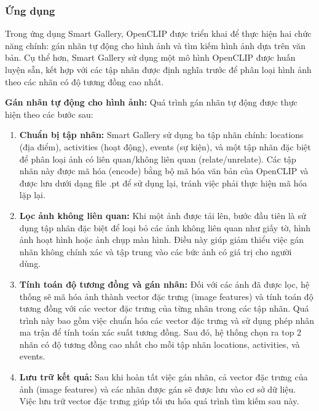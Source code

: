 \subsubsection{Ứng dụng}

Trong ứng dụng Smart Gallery, OpenCLIP được triển khai để thực hiện hai chức năng chính: gán nhãn tự động cho hình ảnh và tìm kiếm hình ảnh dựa trên văn bản. Cụ thể hơn, Smart Gallery sử dụng một mô hình OpenCLIP được huấn luyện sẵn, kết hợp với các tập nhãn được định nghĩa trước để phân loại hình ảnh theo các nhãn có độ tương đồng cao nhất.

\textbf{Gán nhãn tự động cho hình ảnh:} Quá trình gán nhãn tự động được thực hiện theo các bước sau:

\begin{enumerate}
    \item \textbf{Chuẩn bị tập nhãn:} Smart Gallery sử dụng ba tập nhãn chính: locations (địa điểm), activities (hoạt động), events (sự kiện), và một tập nhãn đặc biệt để phân loại ảnh có liên quan/không liên quan (relate/unrelate). Các tập nhãn này được mã hóa (encode) bằng bộ mã hóa văn bản của OpenCLIP và được lưu dưới dạng file .pt để sử dụng lại, tránh việc phải thực hiện mã hóa lặp lại.
    
    \item \textbf{Lọc ảnh không liên quan:} Khi một ảnh được tải lên, bước đầu tiên là sử dụng tập nhãn đặc biệt để loại bỏ các ảnh không liên quan như giấy tờ, hình ảnh hoạt hình hoặc ảnh chụp màn hình. Điều này giúp giảm thiểu việc gán nhãn không chính xác và tập trung vào các bức ảnh có giá trị cho người dùng.
    
    \item \textbf{Tính toán độ tương đồng và gán nhãn:} Đối với các ảnh đã được lọc, hệ thống sẽ mã hóa ảnh thành vector đặc trưng (image features) và tính toán độ tương đồng với các vector đặc trưng của từng nhãn trong các tập nhãn. Quá trình này bao gồm việc chuẩn hóa các vector đặc trưng và sử dụng phép nhân ma trận để tính toán xác suất tương đồng. Sau đó, hệ thống chọn ra top 2 nhãn có độ tương đồng cao nhất cho mỗi tập nhãn locations, activities, và events.
    
    \item \textbf{Lưu trữ kết quả:} Sau khi hoàn tất việc gán nhãn, cả vector đặc trưng của ảnh (image features) và các nhãn được gán sẽ được lưu vào cơ sở dữ liệu. Việc lưu trữ vector đặc trưng giúp tối ưu hóa quá trình tìm kiếm sau này.
\end{enumerate}

